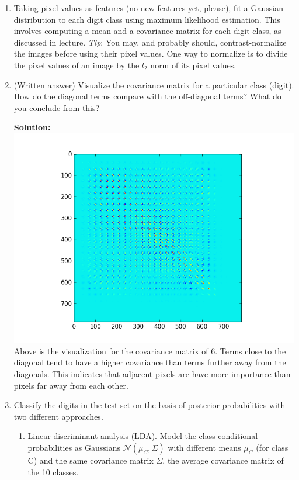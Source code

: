 \documentclass{article}
\newcommand{\solution}{\textbf{Solution: }}
\newcommand{\N}{\mathcal{N}}
\begin{document}
\begin{enumerate}[label=(\alph*)]
    \item Taking pixel values as features (no new features yet, please), fit a Gaussian distribution to each digit class using maximum likelihood estimation. This involves computing a mean and a covariance matrix for each digit class, as discussed in lecture. \emph{Tip}: You may, and probably should, contrast-normalize the images before using their pixel values. One way to normalize is to divide the pixel values of an image by the $l_2$ norm of its pixel values.
    \item (Written answer) Visualize the covariance matrix for a particular class (digit). How do the diagonal terms compare with the off-diagonal terms? What do you conclude from this?
    \begin{mdframed} \solution\\
    \includegraphics[scale=.75]{images/covariance_for_6.png}
    Above is the visualization for the covariance matrix of 6. Terms close to the diagonal tend to have a higher covariance than terms further away from the diagonals. This indicates that adjacent pixels are have more importance than pixels far away from each other.
    \end{mdframed}
    
    \item Classify the digits in the test set on the basis of posterior probabilities with two different approaches.
    \begin{enumerate}[label=(\roman*)]
        \item Linear discriminant analysis (LDA). Model the class conditional probabilities as Gaussians $\N(\mu_C, \Sigma)$ with different means $\mu_C$ (for class C) and the same covariance matrix $\Sigma$, the average covariance matrix of the 10 classes. \\
        

\end{enumerate}
\end{enumerate}
\end{document}
